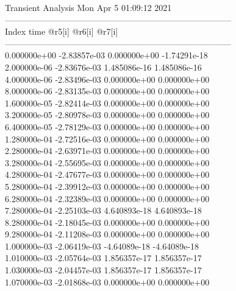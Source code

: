                                    Transient Analysis  Mon Apr  5 01:09:12  2021\\ \hline
--------------------------------------------------------------------------------\\ \hline
Index   time            @r5[i]          @r6[i]          @r7[i]          \\ \hline
--------------------------------------------------------------------------------\\ 	0.000000e+00	-2.83857e-03	0.000000e+00	-1.74291e-18	\\ 	2.000000e-06	-2.83676e-03	1.485086e-16	1.485086e-16	\\ 	4.000000e-06	-2.83496e-03	0.000000e+00	0.000000e+00	\\ 	8.000000e-06	-2.83135e-03	0.000000e+00	0.000000e+00	\\ 	1.600000e-05	-2.82414e-03	0.000000e+00	0.000000e+00	\\ 	3.200000e-05	-2.80978e-03	0.000000e+00	0.000000e+00	\\ 	6.400000e-05	-2.78129e-03	0.000000e+00	0.000000e+00	\\ 	1.280000e-04	-2.72516e-03	0.000000e+00	0.000000e+00	\\ 	2.280000e-04	-2.63971e-03	0.000000e+00	0.000000e+00	\\ 	3.280000e-04	-2.55695e-03	0.000000e+00	0.000000e+00	\\ 	4.280000e-04	-2.47677e-03	0.000000e+00	0.000000e+00	\\ 	5.280000e-04	-2.39912e-03	0.000000e+00	0.000000e+00	\\ 	6.280000e-04	-2.32389e-03	0.000000e+00	0.000000e+00	\\ 	7.280000e-04	-2.25103e-03	4.640893e-18	4.640893e-18	\\ 	8.280000e-04	-2.18045e-03	0.000000e+00	0.000000e+00	\\ 	9.280000e-04	-2.11208e-03	0.000000e+00	0.000000e+00	\\ 	1.000000e-03	-2.06419e-03	-4.64089e-18	-4.64089e-18	\\ 	1.010000e-03	-2.05764e-03	1.856357e-17	1.856357e-17	\\ 	1.030000e-03	-2.04457e-03	1.856357e-17	1.856357e-17	\\ 	1.070000e-03	-2.01868e-03	0.000000e+00	0.000000e+00	\\ \hline
